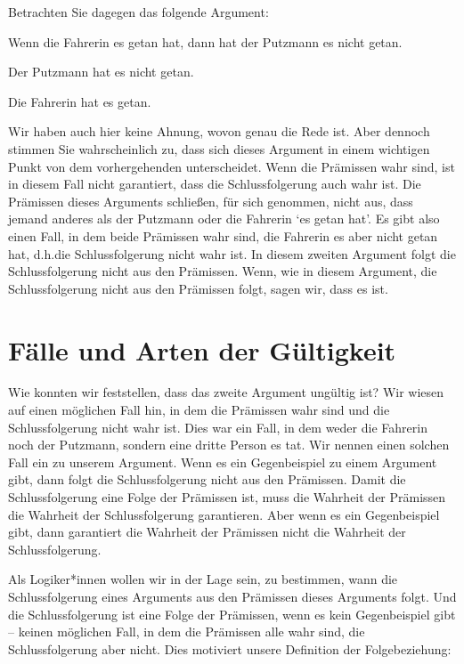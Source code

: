 Betrachten Sie dagegen das folgende Argument:
\begin{earg}\label{argMaidDriver}
	\item[] Wenn die Fahrerin es getan hat, dann hat der Putzmann es nicht getan.
	\item[] Der Putzmann hat es nicht getan.
	\item[\therefore] Die Fahrerin hat es getan.
\end{earg}
Wir haben auch hier keine Ahnung, wovon genau die Rede ist. Aber dennoch stimmen Sie wahrscheinlich zu, dass sich dieses Argument in einem wichtigen Punkt von dem vorhergehenden unterscheidet. Wenn die Prämissen wahr sind, ist in diesem Fall nicht garantiert, dass die Schlussfolgerung auch wahr ist. Die Prämissen dieses Arguments schlie{\ss}en, für sich genommen, nicht aus, dass jemand anderes als der Putzmann oder die Fahrerin `es getan hat'. Es gibt also einen Fall, in dem beide Prämissen wahr sind, die Fahrerin es aber nicht getan hat, d.h.\@ die Schlussfolgerung nicht wahr ist. In diesem zweiten Argument folgt die Schlussfolgerung nicht aus den Prämissen. Wenn, wie in diesem Argument, die Schlussfolgerung nicht aus den Prämissen folgt, sagen wir, dass es  ist.

\section{Fälle und Arten der Gültigkeit}

Wie konnten wir feststellen, dass das zweite Argument ungültig ist? Wir wiesen auf einen möglichen Fall hin, in dem die Prämissen wahr sind und die Schlussfolgerung nicht wahr ist. Dies war ein Fall, in dem weder die Fahrerin noch der Putzmann, sondern eine dritte Person es tat. Wir nennen einen solchen Fall ein  zu unserem Argument. Wenn es ein Gegenbeispiel zu einem Argument gibt, dann folgt die Schlussfolgerung nicht aus den Prämissen. Damit die Schlussfolgerung eine Folge der Prämissen ist, muss die Wahrheit der Prämissen die Wahrheit der Schlussfolgerung garantieren. Aber wenn es ein Gegenbeispiel gibt, dann garantiert die Wahrheit der Prämissen nicht die Wahrheit der Schlussfolgerung.

Als Logiker*innen wollen wir in der Lage sein, zu bestimmen, wann die Schlussfolgerung eines Arguments aus den Prämissen dieses Arguments folgt. Und die Schlussfolgerung ist eine Folge der Prämissen, wenn es kein Gegenbeispiel gibt -- keinen möglichen Fall, in dem die Prämissen alle wahr sind, die Schlussfolgerung aber nicht. Dies motiviert unsere Definition der Folgebeziehung:

